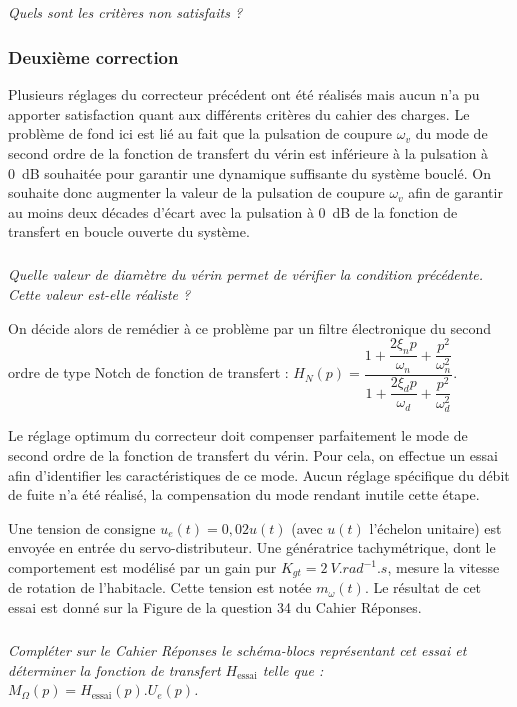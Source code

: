 \begin{multicols}{2}
\begin{multicols}{2}
\subparagraph{}
\textit{Quels sont les critères non satisfaits ?}
\ifprof
\begin{corrige}
\end{corrige}
\else
\fi


\subsubsection*{Deuxième correction}

Plusieurs réglages du correcteur précédent ont été réalisés mais aucun n'a pu apporter satisfaction quant aux différents critères du cahier des charges. Le problème de fond ici est lié au fait que la pulsation de coupure $\omega_v$ du mode de second ordre de la fonction de transfert du vérin est inférieure à la pulsation à \SI{0}{dB} souhaitée pour garantir une dynamique suffisante du système bouclé. On souhaite donc augmenter la valeur de la pulsation de coupure $\omega_v$ afin de garantir au moins deux décades d'écart avec la pulsation à \SI{0}{dB} de la fonction de transfert en boucle ouverte du système.

\subparagraph{}
\textit{Quelle valeur de diamètre du vérin permet de vérifier la condition précédente. Cette valeur est-elle réaliste ?}
\ifprof
\begin{corrige}
\end{corrige}
\else
\fi



On décide alors de remédier à ce problème par un filtre électronique du second ordre de type Notch de fonction de transfert : $H_N(p)=\dfrac{1+\dfrac{2\xi_np}{\omega_n}+\dfrac{p^2}{\omega_n^2}}{1+\dfrac{2\xi_dp}{\omega_d}+\dfrac{p^2}{\omega_d^2}}$.
 
Le réglage optimum du correcteur doit compenser parfaitement le mode de second ordre de la fonction de transfert du vérin. Pour cela, on effectue un essai afin d'identifier les caractéristiques de ce mode. Aucun réglage spécifique du débit de fuite n'a été réalisé, la compensation du mode rendant inutile cette étape.

Une tension de consigne $u_e(t) = 0,02 u(t)$ (avec $u(t)$ l'échelon unitaire) est envoyée en entrée du servo-distributeur. Une génératrice tachymétrique, dont le comportement est modélisé par un gain pur $K_{gt} = \SI{2}{V.rad^{-1}.s}$, mesure la vitesse de rotation de l'habitacle. Cette tension est notée $m_{\omega}(t)$. Le résultat de cet essai est donné sur la Figure de la question 34 du Cahier Réponses.

\subparagraph{}
\textit{Compléter sur le Cahier Réponses le schéma-blocs représentant cet essai et déterminer la fonction de transfert $H_{\text{essai}}$ telle que : $M_{\Omega}(p) = H_{\text{essai}}(p).U_e(p)$.}
\ifprof
\begin{corrige}
\end{corrige}
\else
\fi



\end{multicols}
\end{multicols}

